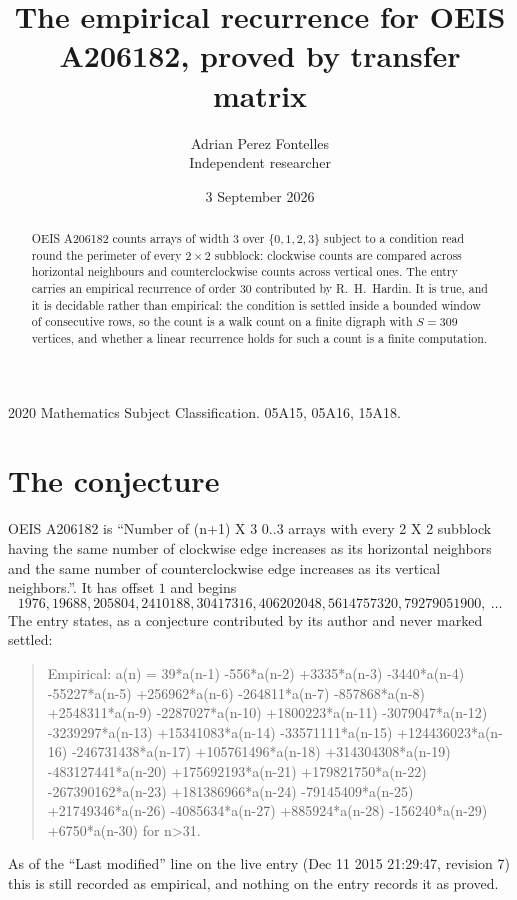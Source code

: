 \documentclass[11pt,a4paper]{article}
\title{The empirical recurrence for OEIS A206182, proved by transfer matrix}
\author{Adrian Perez Fontelles\\ \small Independent researcher}
\date{3 September 2026}
\theoremstyle{plain}
\theoremstyle{definition}
\begin{document}
\maketitle

\begin{abstract}
OEIS A206182 counts arrays of width $3$ over $\{0,1,2,3\}$ subject to a condition read round the
perimeter of every $2\times2$ subblock: clockwise counts are compared across horizontal neighbours and counterclockwise counts across vertical ones. The entry carries an empirical recurrence of
order $30$ contributed by R.~H.~Hardin. It is true, and it is decidable rather than
empirical: the condition is settled inside a bounded window of consecutive rows, so the
count is a walk count on a finite digraph with $S=309$ vertices, and whether a linear
recurrence holds for such a count is a finite computation.
\end{abstract}

\noindent\small 2020 Mathematics Subject Classification. 05A15, 05A16, 15A18.\normalsize

\section{The conjecture}

OEIS A206182 is ``Number of (n+1) X 3 0..3 arrays with every 2 X 2 subblock having the same number of clockwise edge increases as its horizontal neighbors and the same number of counterclockwise edge increases as its vertical neighbors.''. It has offset $1$ and begins
\[
1976, 19688, 205804, 2410188, 30417316, 406202048, 5614757320, 79279051900,\ \dots
\]
The entry states, as a conjecture contributed by its author and never marked settled:
\begin{quote}
Empirical: a(n) = 39*a(n-1) -556*a(n-2) +3335*a(n-3) -3440*a(n-4) -55227*a(n-5) +256962*a(n-6) -264811*a(n-7) -857868*a(n-8) +2548311*a(n-9) -2287027*a(n-10) +1800223*a(n-11) -3079047*a(n-12) -3239297*a(n-13) +15341083*a(n-14) -33571111*a(n-15) +124436023*a(n-16) -246731438*a(n-17) +105761496*a(n-18) +314304308*a(n-19) -483127441*a(n-20) +175692193*a(n-21) +179821750*a(n-22) -267390162*a(n-23) +181386966*a(n-24) -79145409*a(n-25) +21749346*a(n-26) -4085634*a(n-27) +885924*a(n-28) -156240*a(n-29) +6750*a(n-30) for n>31.
\end{quote}
As of the ``Last modified'' line on the live entry (Dec 11 2015 21:29:47, revision 7) this is still
recorded as empirical, and nothing on the entry records it as proved.
\end{document}

